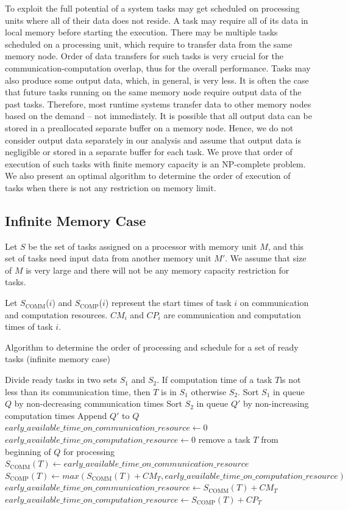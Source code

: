 \documentclass[sigconf]{acmart}
\newcommand{\scomm}{\ensuremath{{S}_{\text{COMM}}}}
\newcommand{\scomp}{\ensuremath{{S}_{\text{COMP}}}}
\begin{document}
To exploit the full potential of a system tasks may get scheduled on processing
units where all of their data does not reside. A task may require all of its data
in local memory before starting the execution. There may be multiple tasks
scheduled on a processing unit, which require to transfer data from the same
memory node. Order of data transfers for such tasks is very crucial for the
communication-computation overlap, thus for the overall performance. Tasks may
also produce some output data, which, in general, is very less.  It is often the case that future tasks running on the same memory node require output data of the past tasks. Therefore, most runtime systems transfer data to other memory nodes based on the demand -- not immediately. It is possible that all output data can be stored in a preallocated separate buffer on a memory node. Hence, we do not consider output data separately in our analysis and assume that output data is negligible  or stored in a separate buffer for each task. We prove that order of execution of such tasks with finite memory capacity is an NP-complete problem. We also present an optimal algorithm to determine the order of execution of tasks when there is not any  restriction on memory limit.


\subsection{Infinite Memory Case}
Let $S$ be the set of tasks assigned on a processor with memory unit $M$, and this set of tasks  need input data from another memory unit $M'$. We assume that size of $M$ is very large and there will not be any memory capacity restriction for tasks.

Let \scomm($i$) and  \scomp($i$) represent the start times of task $i$ on communication and computation resources. $CM_i$ and $CP_i$ are communication and computation times of task $i$.

\begin{algorithm}
	\caption{\label{alg:OrderOfExecutionInfinteMemory}Algorithm to determine the order of processing and schedule for a set of ready tasks (infinite memory case)}
	\begin{algorithmic}[1]
		\STATE Divide ready tasks in two sets $S_1$ and $S_2$. If computation time of a task $T$is not less than its communication time, then $T$ is in $S_1$ otherwise $S_2$.
		\STATE Sort $S_1$ in queue $Q$ by non-decreasing communication times
		\STATE Sort $S_2$ in queue $Q'$ by non-increasing computation times
		\STATE Append $Q'$ to $Q$
		\STATE $early\_available\_time\_on\_communication\_resource \gets 0$
		\STATE $early\_available\_time\_on\_computation\_resource \gets 0$
		\STATE remove a task $T$ from beginning of $Q$ for processing
		\STATE $\scomm(T) \gets  early\_available\_time\_on\_communication\_resource$
		\STATE $\scomp(T) \gets  max(\scomm(T) + CM_T, early\_available\_time\_on\_computation\_resource)$
		\STATE $early\_available\_time\_on\_communication\_resource \gets  \scomm(T) + CM_T$
		\STATE $early\_available\_time\_on\_computation\_resource \gets  \scomp(T) + CP_T$
		\ENDWHILE
	\end{algorithmic}
\end{algorithm}
\end{document}
